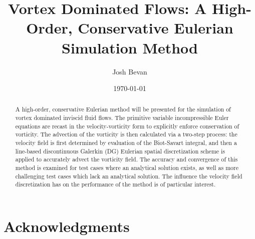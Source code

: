 \documentclass[letterpaper,12pt]{report}
\title{Vortex Dominated Flows: A High-Order, Conservative Eulerian Simulation Method}
\author{Josh Bevan}
\date{\today}
\begin{document}
\maketitle
\begin{abstract}
\setcounter{page}{2} %
\thispagestyle{plain} %
A high-order, conservative Eulerian method will be presented for the simulation of vortex dominated inviscid fluid flows. The primitive variable incompressible Euler equations are recast in the velocity-vorticity form to explicitly enforce conservation of vorticity. The advection of the vorticity is then calculated via a two-step process: the velocity field is first determined by evaluation of the Biot-Savart integral, and then a line-based discontinuous Galerkin (DG) Eulerian spatial discretization scheme is applied to accurately advect the vorticity field. The accuracy and convergence of this method is examined for test cases where an analytical solution exists, as well as more challenging test cases which lack an analytical solution. The influence the velocity field discretization has on the performance of the method is of particular interest.
\end{abstract}

\setcounter{page}{3} %
\chapter*{Acknowledgments}
\begin{singlespace} %
\tableofcontents
\listoftables
{}
\listoffigures
{}
\end{singlespace}

\pagestyle{myheadings}
\makeatletter
\renewcommand\chapter{\if@openright\cleardoublepage\else\clearpage\fi
                    \thispagestyle{myheadings}%
                    \global\@topnum\z@
                    \@afterindentfalse
                    \secdef\@chapter\@schapter}
\makeatother
\end{document}
